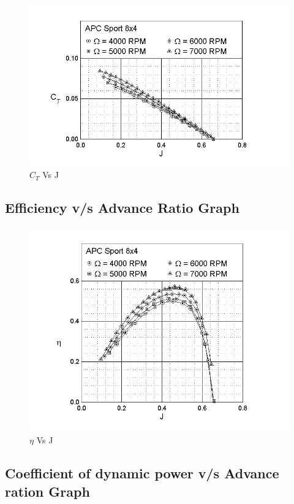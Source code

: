 \begin{figure}[H]
	\centering
	\includegraphics[scale=.5]{graph4}
	\caption{$C_{T}$ Vs J }
	\label{graph}
\end{figure}

\subsection{Efficiency v/s Advance Ratio Graph}
\begin{figure}[H]
	\centering
	\includegraphics[scale=.7]{graph3}
	\caption{$\eta$  Vs J }
	\label{graph}
\end{figure}

\subsection{Coefficient of dynamic power v/s Advance ration Graph}

